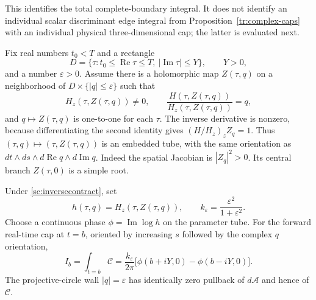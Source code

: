 This identifies the total complete-boundary integral. It does not
identify an individual scalar discriminant edge integral from
Proposition~\ref{tr:complex-caps} with an individual physical
three-dimensional cap; the latter is evaluated next.

Fix real numbers $t_0<T$ and a rectangle
\[
 D=\{\tau:t_0\le\operatorname{Re}\tau\le T,
                 \ |\operatorname{Im}\tau|\le Y\},
 \qquad Y>0,
\]
and a number $\varepsilon>0$. Assume there is a holomorphic map
$Z(\tau,q)$ on a neighborhood of
$D\times\{|q|\le\varepsilon\}$ such that
\begin{equation}
 H_z(\tau,Z(\tau,q))\ne0,\qquad
 \frac{H(\tau,Z(\tau,q))}{H_z(\tau,Z(\tau,q))}=q,
 \label{sc:inversecontract}
\end{equation}
and $q\mapsto Z(\tau,q)$ is one-to-one for each $\tau$.
The inverse derivative is nonzero, because differentiating the second
identity gives $(H/H_z)_z Z_q=1$. Thus
$(\tau,q)\mapsto(\tau,Z(\tau,q))$ is an embedded tube, with the same
orientation as $dt\wedge ds\wedge d\operatorname{Re}q\wedge
 d\operatorname{Im}q$. Indeed the spatial Jacobian is $|Z_q|^2>0$.
Its central branch $Z(\tau,0)$ is a simple root.

\begin{proposition}
\label{sc:capformula}
Under \eqref{sc:inversecontract}, set
\[
 h(\tau,q)=H_z(\tau,Z(\tau,q)),\qquad
 k_\varepsilon=\frac{\varepsilon^2}{1+\varepsilon^2}.
\]
Choose a continuous phase $\phi=\operatorname{Im}\log h$ on the parameter
tube. For the forward real-time cap at $t=b$, oriented by increasing
$s$ followed by the complex $q$ orientation,
\begin{equation}
 I_b=\int_{t=b}\mathcal C
 =\frac{k_\varepsilon}{2\pi}
       \bigl[\phi(b+iY,0)-\phi(b-iY,0)\bigr].
 \label{sc:capexact}
\end{equation}
The projective-circle wall $|q|=\varepsilon$ has identically zero
pullback of $d\mathcal A$ and hence of $\mathcal C$.
\end{proposition}

